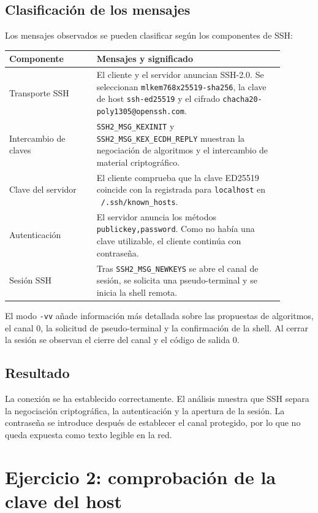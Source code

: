 \documentclass[11pt,a4paper]{article}
\begin{document}
\subsection{Clasificación de los mensajes}
Los mensajes observados se pueden clasificar según los componentes de SSH:
\begin{center}
\begin{tabular}{>{\raggedright\arraybackslash}p{0.29\linewidth} p{0.60\linewidth}}
\toprule
\textbf{Componente} & \textbf{Mensajes y significado}\\
\midrule
Transporte SSH & El cliente y el servidor anuncian SSH-2.0. Se seleccionan
\texttt{mlkem768x25519-sha256}, la clave de host \texttt{ssh-ed25519} y el
cifrado \texttt{chacha20-poly1305@openssh.com}.\\
\addlinespace
Intercambio de claves & \texttt{SSH2\_MSG\_KEXINIT} y
\texttt{SSH2\_MSG\_KEX\_ECDH\_REPLY} muestran la negociación de algoritmos y
el intercambio de material criptográfico.\\
\addlinespace
Clave del servidor & El cliente comprueba que la clave ED25519 coincide con la
registrada para \texttt{localhost} en \texttt{~/.ssh/known\_hosts}.\\
\addlinespace
Autenticación & El servidor anuncia los métodos \texttt{publickey,password}.
Como no había una clave utilizable, el cliente continúa con contraseña.\\
\addlinespace
Sesión SSH & Tras \texttt{SSH2\_MSG\_NEWKEYS} se abre el canal de sesión, se
solicita una pseudo-terminal y se inicia la shell remota.\\
\bottomrule
\end{tabular}
\end{center}
El modo \texttt{-vv} añade información más detallada sobre las propuestas de
algoritmos, el canal 0, la solicitud de pseudo-terminal y la confirmación de la
shell. Al cerrar la sesión se observan el cierre del canal y el código de salida
0.

\subsection{Resultado}
La conexión se ha establecido correctamente. El análisis muestra que SSH separa la
negociación criptográfica, la autenticación y la apertura de la sesión. La
contraseña se introduce después de establecer el canal protegido, por lo que
no queda expuesta como texto legible en la red.

\section{Ejercicio 2: comprobación de la clave del host}
\end{document}

